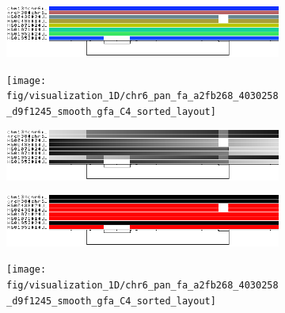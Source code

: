\begin{figure}[h!]
    \begin{subfigure}[b]{.50\linewidth}
        \caption{}
        \centering
        \includegraphics[width=\linewidth, trim=0 +1.5cm -0.5cm 0.5cm]{fig/visualization_1D/chr6_pan_fa_a2fb268_4030258_d9f1245_smooth_gfa_C4_sorted}
        \label{fig:odgi_viz_default}
    \end{subfigure}
    \begin{subfigure}[b]{.50\linewidth}
        \caption{}
        \centering
        \texttt{[image: fig/visualization\_1D/chr6\_pan\_fa\_a2fb268\_4030258\_d9f1245\_smooth\_gfa\_C4\_sorted\_layout]}
        \label{fig:odgi_viz_default2}
    \end{subfigure}

    \begin{subfigure}[b]{.50\linewidth}
        \caption{}
        \centering
        \includegraphics[width=\linewidth, trim=0 +1.5cm -0.5cm 0.5cm]{fig/visualization_1D/chr6_pan_fa_a2fb268_4030258_d9f1245_smooth_gfa_C4_sorted_du}
        \label{fig:odgi_viz_color_by_path_pos}
    \end{subfigure}

    \begin{subfigure}[b]{.50\linewidth}
        \caption{}
        \centering
        \includegraphics[width=\linewidth, trim=0 +1.5cm -0.5cm 0.5cm]{fig/visualization_1D/chr6_pan_fa_a2fb268_4030258_d9f1245_smooth_gfa_C4_sorted_z}
        \label{fig:odgi_viz_color_by_inversion_rate}
    \end{subfigure}
    \begin{subfigure}[b]{.50\linewidth}
        \caption{}
        \centering
        \texttt{[image: fig/visualization\_1D/chr6\_pan\_fa\_a2fb268\_4030258\_d9f1245\_smooth\_gfa\_C4\_sorted\_layout]}
        \label{fig:odgi_viz_color_by_inversion_rate2}
    \end{subfigure}


\end{figure}
